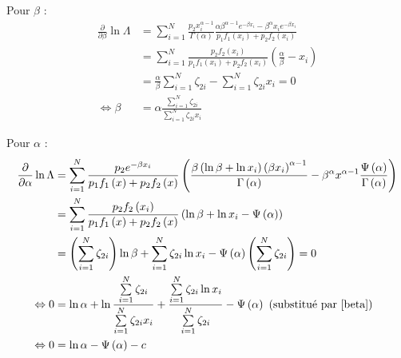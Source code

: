 \documentclass[10pt,a4paper]{article}
\begin{document}
Pour $\beta$ :
\begin{align}
    \frac{\partial }{{\partial \beta }}\ln \Lambda  & = \sum\limits_{i = 1}^N {\frac{{{p_2}x_i^{\alpha  - 1}}}{{\Gamma \left( \alpha  \right)}}\frac{{\alpha {\beta ^{\alpha  - 1}}{e^{ - \beta {x_i}}} - {\beta ^\alpha }{x_i}{e^{ - \beta {x_i}}}}}{{{p_1}{f_1}\left( {{x_i}} \right) + {p_2}{f_2}\left( {{x_i}} \right)}}} \nonumber \\
    & = \sum\limits_{i = 1}^N {\frac{{{p_2}{f_2}\left( {{x_i}} \right)}}{{{p_1}{f_1}\left( {{x_i}} \right) + {p_2}{f_2}\left( {{x_i}} \right)}}\left( {\frac{\alpha }{\beta } - {x_i}} \right)} \nonumber \nonumber \\
    & = \frac{\alpha }{\beta }\sum\limits_{i = 1}^N {{\zeta _{2i}}}  - \sum\limits_{i = 1}^N {{\zeta _{2i}}{x_i}}  = 0 \nonumber \\
    \label{beta}
    \Leftrightarrow \beta & = \alpha \frac{{\sum\limits_{i = 1}^N {{\zeta _{2i}}} }}{{\sum\limits_{i = 1}^N {{\zeta _{2i}}{x_i}} }}
\end{align}

Pour $\alpha$ : 
\begin{align*}
    \frac{\partial }{{\partial \alpha }}\ln \Lambda  & = \sum\limits_{i = 1}^N {\frac{{{p_2}{e^{ - \beta {x_i}}}}}{{{p_1}{f_1}\left( x \right) + {p_2}{f_2}\left( x \right)}}\left( {\frac{{\beta \left( {\ln \beta  + \ln {x_i}} \right){{\left( {\beta {x_i}} \right)}^{\alpha  - 1}}}}{{\Gamma \left( \alpha  \right)}} - {\beta ^\alpha }{x^{\alpha  - 1}}\frac{{\Psi \left( \alpha  \right)}}{{\Gamma \left( \alpha  \right)}}} \right)} \\
    & = \sum\limits_{i = 1}^N {\frac{{{p_2}{f_2}\left( {{x_i}} \right)}}{{{p_1}{f_1}\left( x \right) + {p_2}{f_2}\left( x \right)}}\left( {\ln \beta  + \ln {x_i} - \Psi \left( \alpha  \right)} \right)} \\
    & = \left( {\sum\limits_{i = 1}^N {{\zeta _{2i}}} } \right)\ln \beta  + \sum\limits_{i = 1}^N {{\zeta _{2i}}\ln {x_i}}  - \Psi \left( \alpha  \right)\left( {\sum\limits_{i = 1}^N {{\zeta _{2i}}} } \right) = 0 \\
    \Leftrightarrow 0 & = \ln \alpha  + \ln \frac{{\sum\limits_{i = 1}^N {{\zeta _{2i}}} }}{{\sum\limits_{i = 1}^N {{\zeta _{2i}}{x_i}} }} + \frac{{\sum\limits_{i = 1}^N {{\zeta _{2i}}\ln {x_i}} }}{{\sum\limits_{i = 1}^N {{\zeta _{2i}}} }} - \Psi \left( \alpha  \right) \text{ (substitué par \eqref{beta})} \\
    \Leftrightarrow 0 & = \ln \alpha  - \Psi \left( \alpha  \right) - c
\end{align*}
\end{document}
